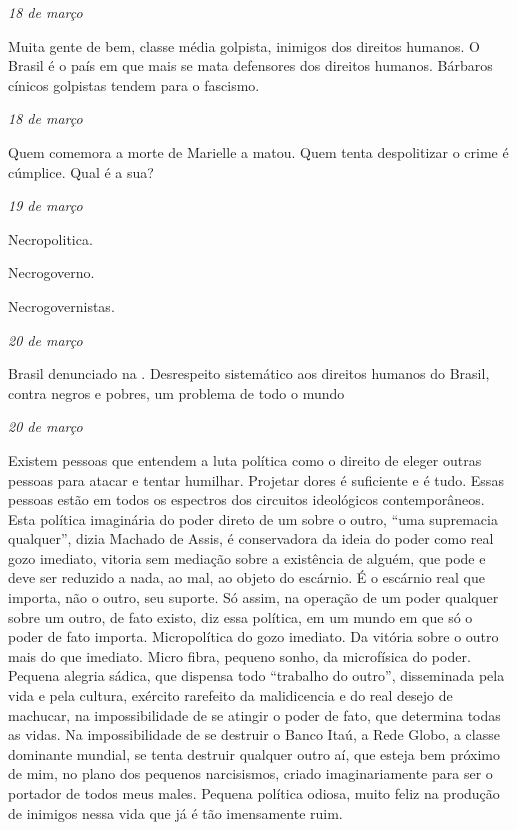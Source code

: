 \begin{flushright}
\emph{18 de março}
\end{flushright}

Muita gente de bem, classe média golpista, inimigos dos direitos
humanos. O Brasil é o país em que mais se mata defensores dos direitos
humanos. Bárbaros cínicos golpistas tendem para o fascismo.

\begin{flushright}
\emph{18 de março}
\end{flushright}

Quem comemora a morte de Marielle a matou. Quem tenta despolitizar o
crime é cúmplice. Qual é a sua?

\begin{flushright}
\emph{19 de março}
\end{flushright}

Necropolitica.

Necrogoverno.

Necrogovernistas.

\begin{flushright}
\emph{20 de março}
\end{flushright}

Brasil denunciado na . Desrespeito sistemático aos direitos humanos
do Brasil, contra negros e pobres, um problema de todo o mundo

\begin{flushright}
\emph{20 de março}
\end{flushright}

Existem pessoas que entendem a luta política como o direito de eleger
outras pessoas para atacar e tentar humilhar. Projetar dores é
suficiente e é tudo. Essas pessoas estão em todos os espectros dos
circuitos ideológicos contemporâneos. Esta política imaginária do poder
direto de um sobre o outro, ``uma supremacia qualquer'', dizia Machado
de Assis, é conservadora da ideia do poder como real gozo imediato,
vitoria sem mediação sobre a existência de alguém, que pode e deve ser
reduzido a nada, ao mal, ao objeto do escárnio. É o escárnio real que
importa, não o outro, seu suporte. Só assim, na operação de um poder
qualquer sobre um outro, de fato existo, diz essa política, em um mundo
em que só o poder de fato importa. Micropolítica do gozo imediato. Da
vitória sobre o outro mais do que imediato. Micro fibra, pequeno sonho,
da microfísica do poder. Pequena alegria sádica, que dispensa todo
``trabalho do outro'', disseminada pela vida e pela cultura, exército
rarefeito da malidicencia e do real desejo de machucar, na
impossibilidade de se atingir o poder de fato, que determina todas as
vidas. Na impossibilidade de se destruir o Banco Itaú, a Rede Globo, a
classe dominante mundial, se tenta destruir qualquer outro aí, que
esteja bem próximo de mim, no plano dos pequenos narcisismos, criado
imaginariamente para ser o portador de todos meus males. Pequena
política odiosa, muito feliz na produção de inimigos nessa vida que já é
tão imensamente ruim.

